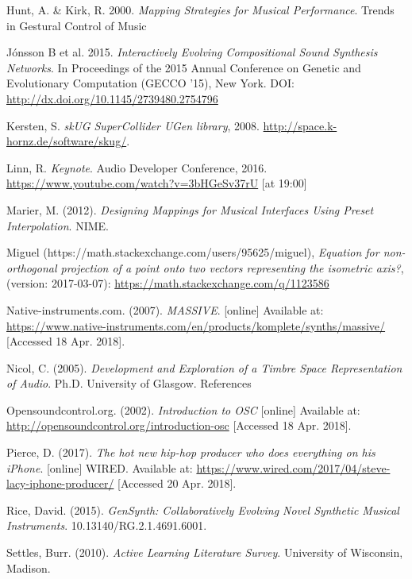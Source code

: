 \documentclass[11pt, oneside]{report}   	%
\begin{document}
\begin{thebibliography}{9}
Hunt, A. \& Kirk, R. 2000. \emph{Mapping Strategies for Musical Performance}. Trends in Gestural Control of Music

J\'{o}nsson B et al. 2015. \emph{Interactively Evolving Compositional Sound Synthesis Networks}. In Proceedings of the 2015 Annual Conference on Genetic and Evolutionary Computation (GECCO '15), New York. DOI: \url{http://dx.doi.org/10.1145/2739480.2754796}

Kersten, S. \emph{skUG SuperCollider UGen library}, 2008. \url{http://space.k- hornz.de/software/skug/}.

Linn, R. \emph{Keynote}.  Audio Developer Conference, 2016. \url{https://www.youtube.com/watch?v=3bHGeSv37rU} [at 19:00]

Marier, M. (2012). \emph{Designing Mappings for Musical Interfaces Using Preset Interpolation}. NIME.

Miguel (https://math.stackexchange.com/users/95625/miguel), \emph{Equation for non-orthogonal projection of a point onto two vectors representing the isometric axis?}, (version: 2017-03-07): \url{https://math.stackexchange.com/q/1123586}

Native-instruments.com. (2007). \emph{MASSIVE}. [online] Available at: \url{https://www.native-instruments.com/en/products/komplete/synths/massive/} [Accessed 18 Apr. 2018].

Nicol, C. (2005). \emph{Development and Exploration of a Timbre Space Representation of Audio}. Ph.D. University of Glasgow.
References

Opensoundcontrol.org. (2002). \emph{Introduction to OSC} [online] Available at: \url{http://opensoundcontrol.org/introduction-osc} [Accessed 18 Apr. 2018].

Pierce, D. (2017). \emph{The hot new hip-hop producer who does everything on his iPhone}. [online] WIRED. Available at: \url{https://www.wired.com/2017/04/steve-lacy-iphone-producer/} [Accessed 20 Apr. 2018].

Rice, David. (2015). \emph{GenSynth: Collaboratively Evolving Novel Synthetic Musical Instruments}. 10.13140/RG.2.1.4691.6001. 

Settles, Burr. (2010). \emph{Active Learning Literature Survey}. University of Wisconsin, Madison.


\end{thebibliography}
\end{document}
